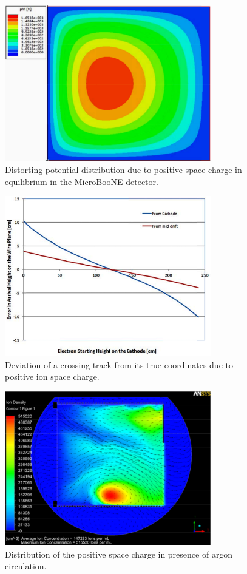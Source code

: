\begin{figure}
\centering	
\includegraphics[width=0.8\textwidth]{figures/Potential.pdf}
\caption{Distorting potential distribution due to positive space charge in equilibrium in the MicroBooNE detector.}
\label{Ions}
\end{figure}

\begin{figure}
\centering	
\includegraphics[width=0.8\textwidth]{figures/Coordinate.pdf}
\caption{Deviation of a crossing track from its true coordinates due to positive ion space charge.}
\label{Coordinates}
\end{figure}

\begin{figure}
\centering	
\includegraphics[width=0.8\textwidth]{figures/Voirin.pdf}
\caption{Distribution of the positive space charge in presence of argon circulation.}
\label{Voirin}
\end{figure}


